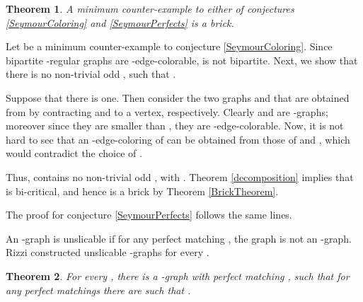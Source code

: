 \documentclass[fleqn,12pt]{article}
\newtheorem{theorem}{Theorem}
\newenvironment{proof}[1][Proof.]{\begin{trivlist}
\item[\hskip \labelsep {\bfseries #1}]}{\end{trivlist}}
\begin{document}
\begin{theorem} A minimum counter-example to either of conjectures \ref{SeymourColoring} and \ref{SeymourPerfects} is a brick.
\end{theorem}

\begin{proof} Let  be a minimum counter-example to conjecture \ref{SeymourColoring}. Since bipartite -regular graphs are -edge-colorable,  is not bipartite. Next, we show that there is no non-trivial odd , such that . 

Suppose that there is one. Then consider the two graphs  and  that are obtained from  by contracting  and  to a vertex, respectively. Clearly  and  are -graphs; moreover since they are smaller than , they are -edge-colorable. Now, it is not hard to see that an -edge-coloring of  can be obtained from those of  and , which would contradict the choice of .

Thus,  contains no non-trivial odd , with . Theorem \ref{decomposition} implies that  is bi-critical, and hence  is a brick by 
Theorem \ref{BrickTheorem}.

The proof for conjecture \ref{SeymourPerfects} follows the same lines.

\end{proof}

An -graph  is unslicable if for any perfect matching , the graph  is not an -graph. Rizzi \cite{Rizzi} constructed unslicable -graphs for every . 

\begin{theorem} For every , there is a -graph  with perfect matching , such that for any  perfect matchings  there are 
 such that .
\end{theorem}
\end{document}
